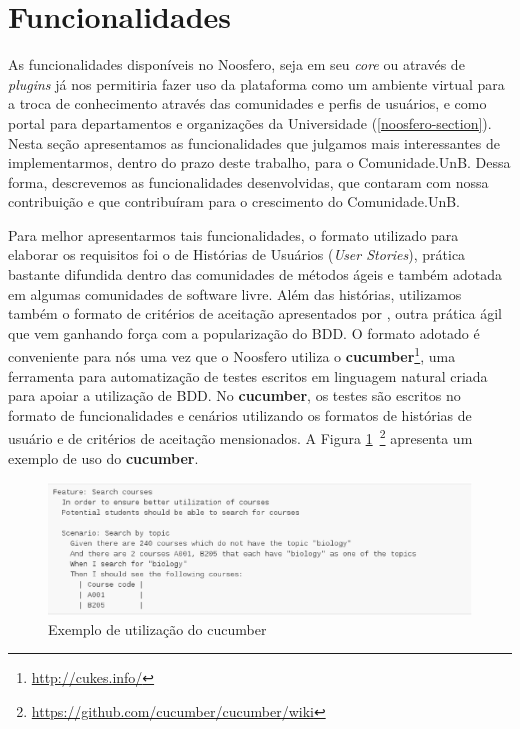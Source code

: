 \section{Funcionalidades}
\label{funcionalidades}



As funcionalidades disponíveis no Noosfero, seja em seu \textit{core}
ou através de \textit{plugins} já nos permitiria fazer uso da plataforma como
um ambiente virtual para a troca de conhecimento através das comunidades e
perfis de usuários, e como portal para departamentos e organizações da
Universidade (\ref{noosfero-section}).
%
Nesta seção apresentamos as funcionalidades que julgamos mais interessantes
de implementarmos, dentro do prazo deste trabalho, para o Comunidade.UnB.
%
Dessa forma, descrevemos as funcionalidades desenvolvidas, que contaram com
nossa contribuição e que contribuíram para o crescimento do Comunidade.UnB.


Para melhor apresentarmos tais funcionalidades, o formato utilizado para
elaborar os requisitos foi o de Histórias de Usuários (\textit{User Stories}),
prática bastante difundida dentro das comunidades de métodos ágeis e também
adotada em algumas comunidades de software livre. 
%
Além das histórias, utilizamos também o formato de critérios de aceitação
apresentados por , outra
prática ágil que vem ganhando força com a popularização do BDD.
%
O formato adotado é conveniente para nós uma vez que o Noosfero utiliza o
\textbf{cucumber}\footnote{\url{http://cukes.info/}}, uma ferramenta para
automatização de testes escritos em linguagem natural criada para apoiar a
utilização de BDD. No \textbf{cucumber}, os testes são escritos no formato
de funcionalidades e cenários utilizando os formatos de histórias de
usuário e de critérios de aceitação mensionados. A Figura
\ref{cucumber}~\footnote{\url{https://github.com/cucumber/cucumber/wiki}}
apresenta um exemplo de uso do \textbf{cucumber}.

\begin{figure}[h]
	\centering
	\includegraphics[keepaspectratio=true,scale=0.6]{figuras/cucumber_sample.eps}
	\caption{Exemplo de utilização do cucumber}
	\label{cucumber}
\end{figure}

